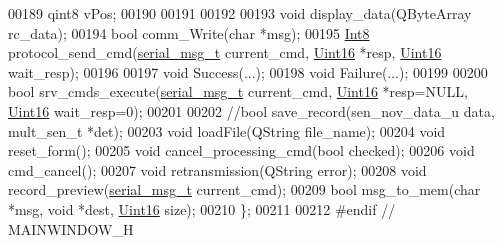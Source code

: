 \begin{DoxyCode}
00189     qint8 vPos;
00190 
00191 
00192 
00193     \textcolor{keywordtype}{void} display\_data(QByteArray rc\_data);
00194     \textcolor{keywordtype}{bool} comm\_Write(\textcolor{keywordtype}{char} *msg);
00195     \hyperlink{a00001_aafb609548b1aa0152c46f9205b79d0f0}{Int8} protocol\_send\_cmd(\hyperlink{a00001_df/dc8/a00122}{serial\_msg\_t} current\_cmd, \hyperlink{a00001_aae7407b021d43f7193a81a58cfb3e297}{Uint16} *resp, 
      \hyperlink{a00001_aae7407b021d43f7193a81a58cfb3e297}{Uint16} wait\_resp);
00196 
00197     \textcolor{keywordtype}{void} Success(...);
00198     \textcolor{keywordtype}{void} Failure(...);
00199 
00200     \textcolor{keywordtype}{bool} srv\_cmds\_execute(\hyperlink{a00001_df/dc8/a00122}{serial\_msg\_t} current\_cmd, \hyperlink{a00001_aae7407b021d43f7193a81a58cfb3e297}{Uint16} *resp=NULL, 
      \hyperlink{a00001_aae7407b021d43f7193a81a58cfb3e297}{Uint16} wait\_resp=0);
00201 
00202     \textcolor{comment}{//bool save\_record(sen\_nov\_data\_u data, mult\_sen\_t *det);}
00203     \textcolor{keywordtype}{void} loadFile(QString file\_name);
00204     \textcolor{keywordtype}{void} reset\_form();
00205     \textcolor{keywordtype}{void} cancel\_processing\_cmd(\textcolor{keywordtype}{bool} checked);
00206     \textcolor{keywordtype}{void} cmd\_cancel();
00207     \textcolor{keywordtype}{void} retransmission(QString error);
00208     \textcolor{keywordtype}{void} record\_preview(\hyperlink{a00001_df/dc8/a00122}{serial\_msg\_t} current\_cmd);
00209     \textcolor{keywordtype}{bool} msg\_to\_mem(\textcolor{keywordtype}{char} *msg, \textcolor{keywordtype}{void} *dest, \hyperlink{a00001_aae7407b021d43f7193a81a58cfb3e297}{Uint16} size);
00210 \};
00211 
00212 \textcolor{preprocessor}{#endif // MAINWINDOW\_H}
\end{DoxyCode}
